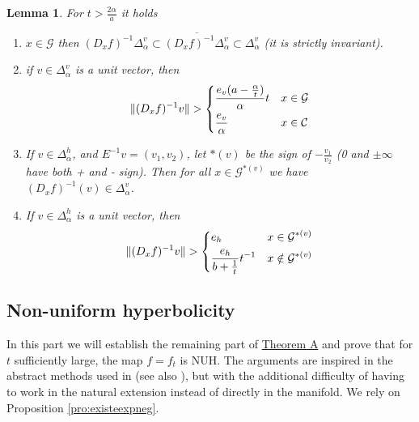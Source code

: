 \documentclass[11pt,letterpaper,reqno]{article}
\newtheorem{lemma}{Lemma}[section]
\newcommand{\Deh}{\Delta_{\alpha}^h}
\newcommand{\Dev}{\Delta_{\alpha}^v}
\begin{document}
\begin{lemma}\label{lem:estimativasst} 
For $t>\frac{2\alpha}a$ it holds
\begin{enumerate}
	\item $x\in \mathcal G$ then $(D_xf)^{-1}\Dev\subset\overline{(D_xf)^{-1}\Dev}\subset\Dev$ (it is strictly invariant).
		\item if $v\in \Dev$ is a unit vector, then
	\begin{align*}
	\|(D_xf)^{-1}v\|>\begin{dcases}
	\frac{e_v(a-\frac{\alpha} t)}{\alpha} t & x\in \mathcal{G}\\
	\frac {e_v}{\alpha} & x\in \mathcal{C}
	\end{dcases}
	\end{align*}
	\item  If $v\in\Deh$, and $E^{-1}v=(v_1,v_2)$, let $*(v)$ be the sign of $-\frac {v_1}{v_2}$ (0 and $\pm\infty$ have both + and - sign). Then for all $x\in \mathcal G^{*(v)}$ we have $(D_xf)^{-1}(v)\in\Dev$.
	\item If $v\in\Deh$ is a unit vector, then
	\begin{align*}
	\|(D_xf)^{-1}v\|>\begin{dcases}
	e_h & x\in \mathcal G^{*(v)}\\
	\frac{e_h}{b+\frac 1t}t^{-1} & x\notin \mathcal G^{*(v)}
	\end{dcases}
	\end{align*}
\end{enumerate}
\end{lemma}



\subsection{Non-uniform hyperbolicity} %
\label{sub:non_uniform_hyperbolicity}


In this part we will establish the remaining part of \hyperlink{theoremA}{Theorem A} and prove that for $t$ sufficiently large, the map $f=f_t$ is NUH. The arguments are inspired in the abstract methods used in \cite{extendedflex} (see also \cite{RandomProdSt}), but with the additional difficulty of having to work in the natural extension instead of directly in the manifold. We rely on Proposition \ref{pro:existeexpneg}.
\end{document}
